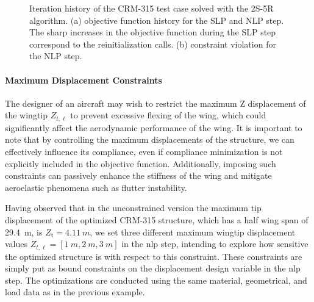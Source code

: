     \begin{figure}
        \centering
        \bigskip
        \caption{Iteration history of the CRM-315 test case solved with the 2S-5R algorithm. (a) objective function history for the SLP and NLP step. The sharp increases in the objective function during the SLP step correspond to the reinitialization calls. (b) constraint violation for the NLP step.}
        \label{fig:07_c2}
    \end{figure}

\paragraph{Maximum Displacement Constraints}
The designer of an aircraft may wish to restrict the maximum Z displacement of the wingtip $Z_{t,\ell}$ to prevent excessive flexing of the wing, which could significantly affect the aerodynamic performance of the wing. It is important to note that by controlling the maximum displacements of the structure, we can effectively influence its compliance, even if compliance minimization is not explicitly included in the objective function. Additionally, imposing such constraints can passively enhance the stiffness of the wing and mitigate aeroelastic phenomena such as flutter instability.

Having observed that in the unconstrained version the maximum tip displacement of the optimized CRM-315 structure, which has a half wing span of \qty{29.4}{m}, is $Z_\text{t}=\qty{4.11}{m}$, we set three different maximum wingtip displacement values $Z_{t,\ell} = [\qty{1}{m},\qty{2}{m},\qty{3}{m}]$ in the \gls{nlp} step, intending to explore how sensitive the optimized structure is with respect to this constraint. These constraints are simply put as bound constraints on the displacement design variable in the \gls{nlp} step. The optimizations are conducted using the same material, geometrical, and load data as in the previous example.


